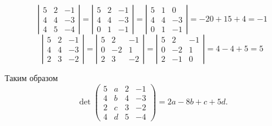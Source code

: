 \documentclass{article}
\begin{document}
$$\left|\begin{array}{rrr}5 & 2 & -1\\4 & 4 & -3\\4 & 5 & -4\end{array}\right|=\left|\begin{array}{rrr}5 & 2 & -1\\4 & 4 & -3\\0 & 1 & -1\end{array}\right|=\left|\begin{array}{rrr}5 & 1 & 0\\4 & 4 & -3\\0 & 1 & -1\end{array}\right|=-20+15+4=-1$$
$$\left|\begin{array}{rrr}5 & 2 & -1\\4 & 4 & -3\\2 & 3 & 
-2\end{array}\right|=\left|\begin{array}{rrr}5 & 2 & -1\\0 & -2 & 1\\2 & 3 & 
-2\end{array}\right|=\left|\begin{array}{rrr}5 & 2 & -1\\0 & -2 & 1\\2 & -1 & 
0\end{array}\right|=4-4+5=5$$
\par
Таким образом
$$\det\left(\begin{array}{rrrr}5 & a & 2 & -1\\4 & b & 4 & -3\\2 & c & 3 & -2\\4 & d & 5 & -4 \end{array}\right)=2a-8b+c+5d.$$
\\
\end{document}
